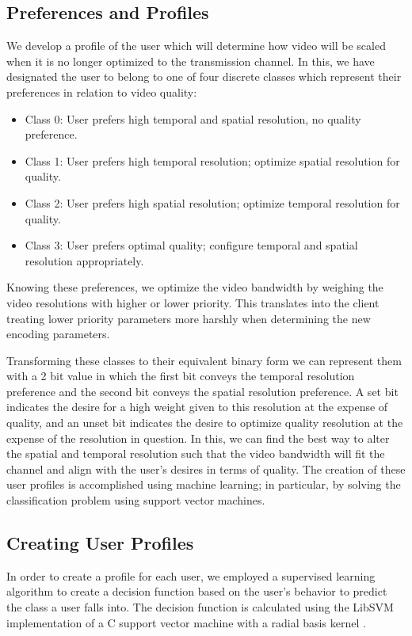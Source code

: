 \documentclass[a4paper,12pt]{article}
\begin{document}
\subsection{Preferences and Profiles}
We develop a profile of the user which will determine how video will be scaled when it is no longer optimized to the transmission channel. In this, we have designated the user to belong to one of four discrete classes which represent their preferences in relation to video quality:
\begin{itemize}
\item Class 0: User prefers high temporal and spatial resolution, no quality preference.
\item Class 1: User prefers high temporal resolution; optimize spatial resolution for quality.
\item Class 2: User prefers high spatial resolution; optimize temporal resolution for quality.
\item Class 3: User prefers optimal quality; configure temporal and spatial resolution appropriately.
\end{itemize}
Knowing these preferences, we optimize the video bandwidth by weighing the video resolutions with higher or lower priority. This translates into the client treating lower priority parameters more harshly when determining the new encoding parameters.

Transforming these classes to their equivalent binary form we can represent them with a 2 bit value in which the first bit conveys the temporal resolution preference and the second bit conveys the spatial resolution preference. A set bit indicates the desire for a high weight given to this resolution at the expense of quality, and an unset bit indicates the desire to optimize quality resolution at the expense of the resolution in question. In this, we can find the best way to alter the spatial and temporal resolution such that the video bandwidth will fit the channel and align with the user's desires in terms of quality. The creation of these user profiles is accomplished using machine learning; in particular, by solving the classification problem using support vector machines.

\subsection{Creating User Profiles}
In order to create a profile for each user, we employed a supervised learning algorithm to create a decision function based on the user’s behavior to predict the class a user falls into. The decision function is calculated using the LibSVM implementation of a C support vector machine with a radial basis kernel \cite{LibSVM}.
\end{document}
